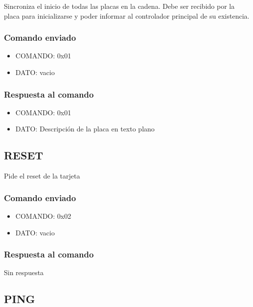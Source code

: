 \documentclass[a4paper,11pt]{article}
\begin{document}
Sincroniza el inicio de todas las placas en la cadena.
Debe ser recibido por la placa para inicializarse y poder informar al controlador principal de su existencia.

\subsubsection*{Comando enviado}
\label{init_comando_enviado}

\begin{itemize}
	\item{COMANDO:} 0x01
	\item{DATO:} vacio
\end{itemize}

\subsubsection*{Respuesta al comando}
\label{init_respuesta}

\begin{itemize}
	\item{COMANDO:} 0x01
	\item{DATO:} Descripci\'on de la placa en texto plano
\end{itemize}

\subsection{RESET}
\label{reset}

Pide el reset de la tarjeta

\subsubsection*{Comando enviado}
\label{reset_comando_enviado}

\begin{itemize}
	\item{COMANDO:} 0x02
	\item{DATO:} vacio
\end{itemize}

\subsubsection*{Respuesta al comando}
\label{reset_respuesta}

Sin respuesta

\subsection{PING}
\label{ping}
\end{document}
